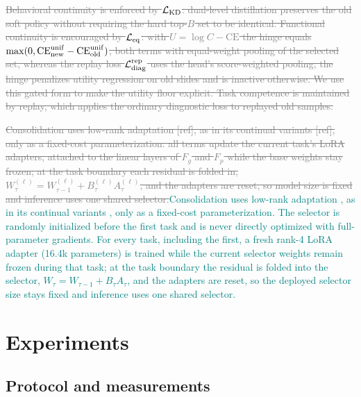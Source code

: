\documentclass{article}
\newif\ifmarkup \markuptrue
\newcommand{\repc}[3]{\ifmarkup\textcolor{gray}{\sout{#2}}\textcolor{#1}{#3}\else#3\fi}
\newcommand{\repG}[2]{\repc{teal}{#1}{#2}}    %
\def\L{{\cal L}}
\newcommand{\Fg}{F_g}
\newcommand{\Fp}{F_p}
\begin{document}
\repG{Behavioral continuity is enforced by $\L_{\rm KD}$: dual-level distillation preserves the old soft policy without requiring the hard top-$B$ set to be identical. Functional continuity is encouraged by $\L_{\rm eq}$: with $U=\log C-\mathrm{CE}$ the hinge equals $\max(0,\mathrm{CE}^{\rm unif}_{\rm new}-\mathrm{CE}^{\rm unif}_{\rm old})$, both terms with equal-weight pooling of the selected set, whereas the replay loss $\L_{\mathrm{diag}}^{\mathrm{rep}}$ uses the head's score-weighted pooling; the hinge penalizes utility regression on old slides and is inactive otherwise. We use this gated form to make the utility floor explicit. Task competence is maintained by replay, which applies the ordinary diagnostic loss to replayed old samples.}{}

\repG{Consolidation uses low-rank adaptation [ref], as in its continual variants [ref], only as a fixed-cost parameterization: all terms update the current task's LoRA adapters, attached to the linear layers of $\Fg$ and $\Fp$ while the base weights stay frozen; at the task boundary each residual is folded in, $W^{(\ell)}_{\tau}=W^{(\ell)}_{\tau-1}+B^{(\ell)}_\tau A^{(\ell)}_\tau$, and the adapters are reset, so model size is fixed and inference uses one shared selector.}{Consolidation uses low-rank adaptation \cite{hu2022lora}, as in its continual variants \cite{liang2024inflora,wu2025sdlora,he2025cllora,chen2026flexem}, only as a fixed-cost parameterization. The selector is randomly initialized before the first task and is never directly optimized with full-parameter gradients. For every task, including the first, a fresh rank-4 LoRA adapter (16.4k parameters) is trained while the current selector weights remain frozen during that task; at the task boundary the residual is folded into the selector, $W_{\tau}=W_{\tau-1}+B_\tau A_\tau$, and the adapters are reset, so the deployed selector size stays fixed and inference uses one shared selector.}

\section{Experiments}
\label{sec:exp}

\subsection{Protocol and measurements}
\label{ssec:protocol}
\end{document}
